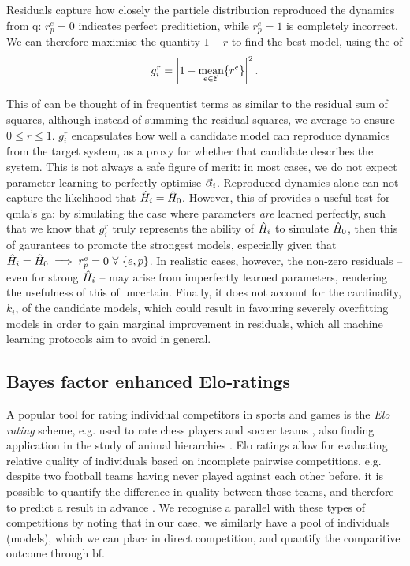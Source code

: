 Residuals capture how closely the particle distribution reproduced the dynamics from \gls{q}:
    $r^{e}_{p} = 0$ indicates perfect preditiction, while $r^e_p=1$ is completely incorrect. 
We can therefore maximise the quantity $1-r$ to find    the best model, 
    using the \gls{of}
\begin{equation}
    \label{eqn:residual_fitness}
    g^r_i = \left| 1 - \underset{e \in { \mathcal{E} }}{\text{mean}}\{ {r^e} \}\right|^2.
\end{equation}
\par     
This \gls{of} can be thought of in frequentist terms 
    as similar to the residual sum of squares,
    although instead of summing the residual squares, we average to ensure $0 \leq r \leq 1$. 
$g_i^r$ encapsulates how well a candidate model can reproduce dynamics 
    from the target system, as a proxy for whether that candidate describes the system. 
This is not always a safe figure of merit: 
    in most cases, we do not expect parameter learning to perfectly optimise $\vec{\alpha}_i$. 
Reproduced dynamics alone can not capture the likelihood that $\hat{H}_i=\hat{H}_0$. 
However, this \gls{of} provides a useful test for \gls{qmla}'s \gls{ga}:
    by simulating the case where parameters \emph{are} learned perfectly, 
    such that we know that $g_i^r$ truly represents the ability of $\hat{H}_i$ to 
    simulate $\hat{H}_0$, then this \gls{of} gaurantees to promote  the strongest models,
    especially given that $\hat{H}_i=\hat{H}_0 \implies r_p^e=0 \ \forall \ \{e, p\}$. 
In realistic cases, however, the non-zero residuals -- even for 
    strong $\hat{H}_i$ -- may arise from imperfectly learned parameters,
    rendering the usefulness of this \gls{of} uncertain. 
Finally, it does not account for the cardinality, $k_i$, of the candidate models, 
    which could result in favouring severely overfitting models in order to gain marginal improvement 
    in residuals, which all machine learning protocols aim to avoid in general.

\subsection{Bayes factor enhanced Elo-ratings}\label{sec:elo}
A popular tool for rating individual competitors in sports and games is the \emph{Elo rating} scheme, 
    e.g. used to rate chess players and soccer teams \cite{elo1978rating, fifa_elo}, 
    also finding application in the study of animal hierarchies \cite{neumann2011assessing}. 
Elo ratings allow for evaluating relative quality of individuals 
    based on incomplete pairwise competitions, 
    e.g. despite two football teams having never played against each other before, 
    it is possible to quantify the difference in quality between those teams, 
    and therefore to predict a result in advance \cite{hvattum2010using}. 
We recognise a parallel with these types of competitions by noting that
    in our case, we similarly have a pool of individuals (models), 
    which we can place in direct competition, and quantify the comparitive outcome through \gls{bf}. 


